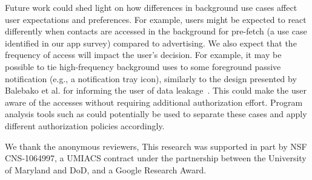 Future work could shed light on how differences in background use cases 
affect user expectations and preferences. For example, users might be expected 
to react differently when contacts are accessed in the background for pre-fetch 
(a use case identified in our app survey) compared to advertising. We also
expect that the frequency of access will impact the user's
  decision. For example, it may be possible to tie high-frequency background uses to some 
foreground passive notification (e.g., a notification tray icon), similarly to the design presented 
by Balebako et al. for informing the user of data leakage~\cite{Balebako:2013}. This could 
make the user aware of the accesses without requiring additional authorization effort.
Program analysis tools such as \apptracer{} could potentially be used to 
separate these cases and apply different authorization policies accordingly.

We thank the anonymous reviewers,  This research was
supported in part by NSF CNS-1064997, a UMIACS contract under the
partnership between the University of Maryland and DoD, and a Google
Research Award.
